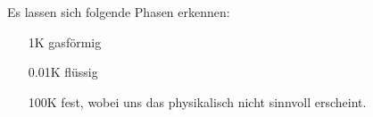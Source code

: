 Es lassen sich folgende Phasen erkennen:
\begin{enumerate}
\item[1K] gasförmig \\
\item[0.01K] flüssig \\
\item[100K] fest, wobei uns das physikalisch nicht sinnvoll erscheint.\\
\end{enumerate}

\begin{comment}
\begin{landscape}
	\begin{figure}
		\OverfullCenter{\texttt{[image: ../A1/A3\_savedata.pdf]}}
		\caption{Graphische Darstellung der Ergebnisse von Aufgabe 1d: Plots der Energien}
		\label{fig:energie}
	\end{figure}
\end{landscape} 

\begin{landscape}
	\begin{figure}
		\OverfullCenter{\texttt{[image: ../A1/A3\_paar.pdf]}}
		\caption{Graphische Darstellung der Ergebnisse von Aufgabe 1d: Plots der Paarkorrelationsfunktion}
		\label{fig:energie}
	\end{figure}
\end{landscape} 
\end{comment}


